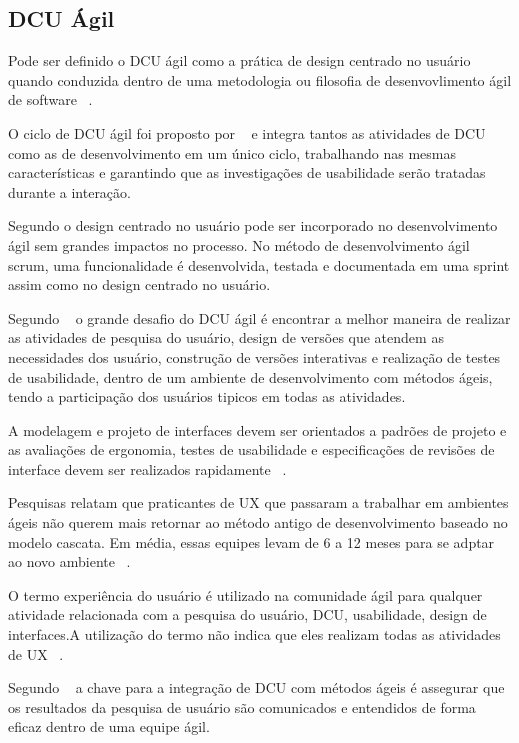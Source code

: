 \subsection{DCU Ágil}


        Pode ser definido o DCU ágil como a prática de design centrado no usuário quando conduzida dentro de uma metodologia ou filosofia de desenvovlimento ágil de software ~\cite{santos2012}.

	O ciclo de DCU ágil foi proposto por ~ e integra tantos as atividades de DCU como as de desenvolvimento em um único ciclo, trabalhando nas mesmas características e garantindo que as investigações de usabilidade serão tratadas durante a interação.

	Segundo  o design centrado no usuário pode ser incorporado no desenvolvimento ágil sem grandes impactos no processo. No método de desenvolvimento ágil scrum, uma funcionalidade é desenvolvida, testada e documentada em uma sprint assim como no design centrado no usuário. 
	
	Segundo ~ o grande desafio do DCU ágil é encontrar a melhor maneira de realizar as atividades de pesquisa do usuário, design de versões que atendem as necessidades dos usuário, construção de versões interativas e realização de testes de usabilidade, dentro de um ambiente de desenvolvimento com métodos ágeis, tendo a participação dos usuários tipicos em todas as atividades.
	
        A modelagem e projeto de interfaces devem ser orientados a padrões de projeto e as avaliações de ergonomia, testes de usabilidade e especificações de revisões de interface devem ser realizados rapidamente ~\cite{cybis2010}.
	
	Pesquisas relatam que praticantes de UX que passaram a trabalhar em ambientes ágeis não querem mais retornar ao método antigo de desenvolvimento baseado no modelo cascata. Em média, essas equipes levam de 6 a 12 meses para se adptar ao novo ambiente ~\cite{santos2012}.

	O termo experiência do usuário é utilizado na comunidade ágil para qualquer atividade relacionada com a pesquisa do usuário, DCU, usabilidade, design de interfaces.A utilização do termo não indica que eles realizam todas as atividades de UX ~\cite{santos2012}.

	Segundo ~ a chave para a integração de DCU com métodos ágeis é assegurar que os resultados da pesquisa de usuário são comunicados e entendidos de forma eficaz dentro de uma equipe ágil.


